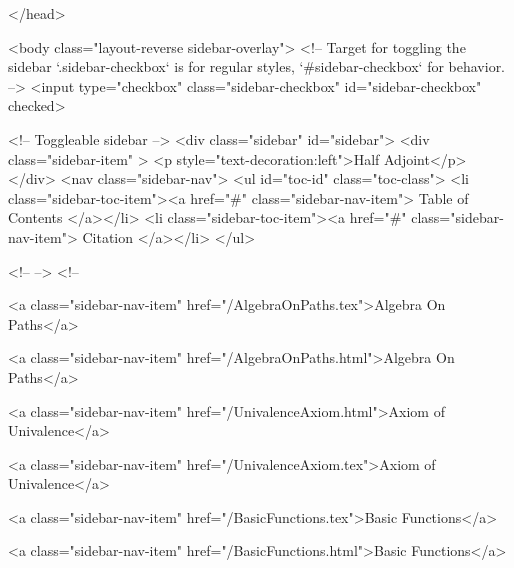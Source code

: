   
</head>




  <body class="layout-reverse sidebar-overlay">
    <!-- Target for toggling the sidebar `.sidebar-checkbox` is for regular
     styles, `#sidebar-checkbox` for behavior. -->
<input type="checkbox" class="sidebar-checkbox" id="sidebar-checkbox" checked>

<!-- Toggleable sidebar -->
<div class="sidebar" id="sidebar">
  <div class="sidebar-item" >
    <p style="text-decoration:left">Half Adjoint</p>
  </div>
  <nav class="sidebar-nav">
    <ul id="toc-id" class="toc-class">
  <li class="sidebar-toc-item"><a href="#" class="sidebar-nav-item"> Table of Contents </a></li>
  <li class="sidebar-toc-item"><a href="#" class="sidebar-nav-item"> Citation </a></li>
</ul>


    <!--  -->
    <!-- 
      
    
      
    
      
    
      
        
      
    
      
        
          <a class="sidebar-nav-item" href="/AlgebraOnPaths.tex">Algebra On Paths</a>
        
      
    
      
        
          <a class="sidebar-nav-item" href="/AlgebraOnPaths.html">Algebra On Paths</a>
        
      
    
      
        
          <a class="sidebar-nav-item" href="/UnivalenceAxiom.html">Axiom of Univalence</a>
        
      
    
      
        
          <a class="sidebar-nav-item" href="/UnivalenceAxiom.tex">Axiom of Univalence</a>
        
      
    
      
        
          <a class="sidebar-nav-item" href="/BasicFunctions.tex">Basic Functions</a>
        
      
    
      
        
          <a class="sidebar-nav-item" href="/BasicFunctions.html">Basic Functions</a>
        
      
    
